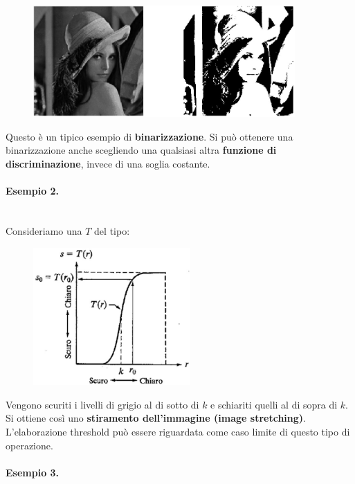 \begin{figure}[H]
    \centering
    \includegraphics[width=10cm, keepaspectratio]{capitoli/immagini/imgs/foto_esempio_1.jpg}
\end{figure}

Questo è un tipico esempio di \textbf{binarizzazione}.
Si può ottenere una binarizzazione anche scegliendo una qualsiasi
altra \textbf{funzione di discriminazione}, invece di una soglia costante.

\paragraph{Esempio 2.}\ \\

Consideriamo una $T$ del tipo:

\begin{figure}[H]
    \centering
    \includegraphics[width=6cm, keepaspectratio]{capitoli/immagini/imgs/trasformazione_esempio_2.jpg}
\end{figure}

Vengono scuriti i livelli di grigio al di sotto di $k$ e schiariti quelli al
di sopra di $k$. Si ottiene così uno \textbf{stiramento dell'immagine (image
    stretching)}. L'elaborazione threshold può essere riguardata come
caso limite di questo tipo di operazione.

\paragraph{Esempio 3.}\ \\

